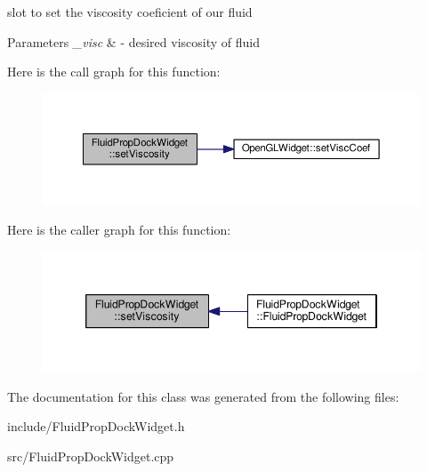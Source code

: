 slot to set the viscosity coeficient of our fluid 


\begin{DoxyParams}{Parameters}
{\em \-\_\-visc} & -\/ desired viscosity of fluid \\
\hline
\end{DoxyParams}


Here is the call graph for this function\-:\nopagebreak
\begin{figure}[H]
\begin{center}
\leavevmode
\includegraphics[width=350pt]{class_fluid_prop_dock_widget_a473ce1156c2ab118e6af5d99ec700764_cgraph}
\end{center}
\end{figure}




Here is the caller graph for this function\-:\nopagebreak
\begin{figure}[H]
\begin{center}
\leavevmode
\includegraphics[width=346pt]{class_fluid_prop_dock_widget_a473ce1156c2ab118e6af5d99ec700764_icgraph}
\end{center}
\end{figure}




The documentation for this class was generated from the following files\-:\begin{DoxyCompactItemize}
\item 
include/Fluid\-Prop\-Dock\-Widget.\-h\item 
src/Fluid\-Prop\-Dock\-Widget.\-cpp\end{DoxyCompactItemize}
